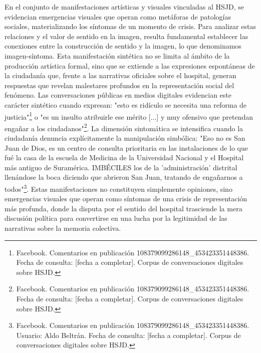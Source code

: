 En el conjunto de manifestaciones artísticas y visuales vinculadas al HSJD, se evidencian emergencias visuales que operan como metáforas de patologías sociales, materializando los síntomas de un momento de crisis. Para analizar estas relaciones y el valor de sentido en la imagen, resulta fundamental establecer las conexiones entre la construcción de sentido y la imagen, lo que denominamos imagen-síntoma. Esta manifestación sintética no se limita al ámbito de la producción artística formal, sino que se extiende a las expresiones espontáneas de la ciudadanía que, frente a las narrativas oficiales sobre el hospital, generan respuestas que revelan malestares profundos en la representación social del fenómeno. Las conversaciones públicas en medios digitales evidencian este carácter sintético cuando expresan: "esto es ridículo se necesita una reforma de justicia"\footnote{Facebook. Comentarios en publicación 108379099286148\_453423351448386. Fecha de consulta: [fecha a completar]. Corpus de conversaciones digitales sobre HSJD.} o "es un insulto atribuirle ese mérito [...] y muy ofensivo que pretendan engañar a los ciudadanos"\footnote{Facebook. Comentarios en publicación 108379099286148\_453423351448386. Fecha de consulta: [fecha a completar]. Corpus de conversaciones digitales sobre HSJD.}. La dimensión sintomática se intensifica cuando la ciudadanía denuncia explícitamente la manipulación simbólica: "Eso no es San Juan de Dios, es un centro de consulta prioritaria en las instalaciones de lo que fué la casa de la escuela de Medicina de la Universidad Nacional y el Hospital más antiguo de Suramérica. IMBÉCILES los de la 'administración' distrital llenándose la boca diciendo que abrieron San Juan, tratando de engañarnos a todos"\footnote{Facebook. Comentarios en publicación 108379099286148\_453423351448386. Usuario: Aldo Beltrán. Fecha de consulta: [fecha a completar]. Corpus de conversaciones digitales sobre HSJD.}. Estas manifestaciones no constituyen simplemente opiniones, sino emergencias visuales que operan como síntomas de una crisis de representación más profunda, donde la disputa por el sentido del hospital trasciende la mera discusión política para convertirse en una lucha por la legitimidad de las narrativas sobre la memoria colectiva.

